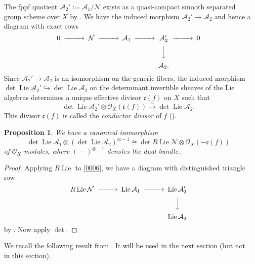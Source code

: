 \documentclass{amsart}
\newtheorem{proposition}[theorem]{Proposition}
\theoremstyle{remark}
\numberwithin{equation}{section}
\newcommand{\Order}{\mathcal{O}}
\newcommand{\into}{\hookrightarrow}
\newcommand{\isomto}{\overset{\sim}{\to}}
\newcommand{\tensor}{\mathbin{\otimes}}
\newcommand{\var}{\;\cdot\;}
\newcommand{\ideal}[1]{\mathfrak{#1}}
\DeclareMathOperator{\Lie}{Lie}
\begin{document}
The fppf quotient $\mathcal{A}_{2}' := \mathcal{A}_{1} / \mathcal{N}$
exists as a quasi-compact smooth separated group scheme over $X$
by \cite[Theorem 4.C]{Ana73}.
We have the induced morphism
$\mathcal{A}_{2}' \to \mathcal{A}_{2}$
and hence a diagram with exact rows
	\begin{equation} \label{0006}
		\begin{CD}
				0
			@>>>
				\mathcal{N}
			@>>>
				\mathcal{A}_{1}
			@>>>
				\mathcal{A}_{2}'
			@>>>
				0
			\\ @. @. @. @VVV \\
			@. @. @. \mathcal{A}_{2}.
		\end{CD}
	\end{equation}
Since $\mathcal{A}_{2}' \to \mathcal{A}_{2}$ is
an isomorphism on the generic fibers,
the induced morphism
$\det \Lie \mathcal{A}_{2}' \into \det \Lie \mathcal{A}_{2}$
on the determinant invertible sheaves of the Lie algebras
determines a unique effective divisor $\ideal{c}(f)$ on $X$
such that
	\[
			\det \Lie \mathcal{A}_{2}' \tensor \Order_{X}(\ideal{c}(f))
		\isomto
			\det \Lie \mathcal{A}_{2}.
	\]
This divisor $\ideal{c}(f)$ is called
the \emph{conductor divisor} of $f$
(\cite[Definition 5.1 (1)]{GRS24}).

\begin{proposition} \label{0007}
	We have a canonical isomorphism
		\[
					\det \Lie \mathcal{A}_{1}
				\tensor
					(\det \Lie \mathcal{A}_{2})^{\tensor -1}
			\cong
					\det R \Lie \mathcal{N}
				\tensor
					\Order_{X}(- \ideal{c}(f))
		\]
	of $\Order_{X}$-modules,
	where $(\var)^{\tensor -1}$ denotes the dual bundle.
\end{proposition}

\begin{proof}
	Applying $R \Lie$ to \eqref{0006},
	we have a diagram with distinguished triangle row
	\[
		\begin{CD}
				R \Lie \mathcal{N}
			@>>>
				\Lie \mathcal{A}_{1}
			@>>>
				\Lie \mathcal{A}_{2}'
			\\ @. @. @VVV \\
			@. @. \Lie \mathcal{A}_{2}
		\end{CD}
	\]
	by \cite[Chapter VII, Proposition 3.1.1.5]{Ill72}.
	Now apply $\det$.
\end{proof}

We recall the following result from \cite{GRS24}.
It will be used in the next section
(but not in this section).
\end{document}
